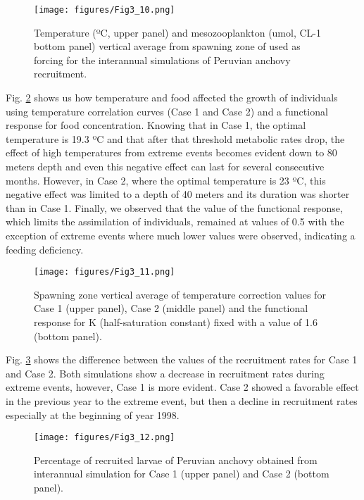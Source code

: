 \begin{figure}[ht]
	\texttt{[image: figures/Fig3\_10.png]}
	\centering
	\caption{Temperature (ºC, upper panel) and mesozooplankton (umol, CL-1 bottom panel) vertical average from spawning zone of used as forcing for the interannual simulations of Peruvian anchovy recruitment.}
	\label{Fig3_10}
\end{figure}

Fig. \ref{Fig3_11} shows us how temperature and food affected the growth of individuals using temperature correlation curves (Case 1 and Case 2) and a functional response for food concentration. Knowing that in Case 1, the optimal temperature is 19.3 ºC and that after that threshold metabolic rates drop, the effect of high temperatures from extreme events becomes evident down to 80 meters depth and even this negative effect can last for several consecutive months. However, in Case 2, where the optimal temperature is 23 ºC, this negative effect was limited to a depth of 40 meters and its duration was shorter than in Case 1. Finally, we observed that the value of the functional response, which limits the assimilation of individuals, remained at values of 0.5 with the exception of extreme events where much lower values were observed, indicating a feeding deficiency.\\

\begin{figure}[ht]
	\texttt{[image: figures/Fig3\_11.png]}
	\centering
	\caption{Spawning zone vertical average of temperature correction values for Case 1 (upper panel), Case 2 (middle panel) and the functional response for K (half-saturation constant) fixed with a value of 1.6 (bottom panel).}
	\label{Fig3_11}
\end{figure}

Fig. \ref{Fig3_12} shows the difference between the values of the recruitment rates for Case 1 and Case 2. Both simulations show a decrease in recruitment rates during extreme events, however, Case 1 is more evident. Case 2 showed a favorable effect in the previous year to the extreme event, but then a decline in recruitment rates especially at the beginning of year 1998.\\

\begin{figure}[ht]
	\texttt{[image: figures/Fig3\_12.png]}
	\centering
	\caption{Percentage of recruited larvae of Peruvian anchovy obtained from interannual simulation for Case 1 (upper panel) and Case 2 (bottom panel).}
	\label{Fig3_12}
\end{figure}

